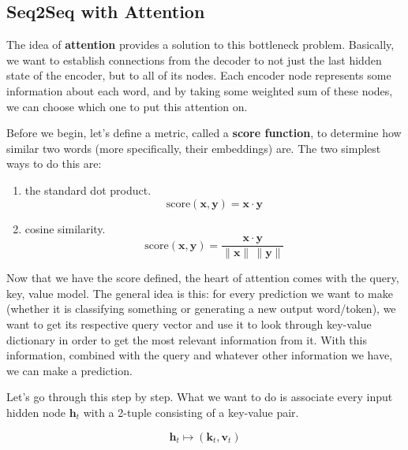 \subsection{Seq2Seq with Attention}

  The idea of \textbf{attention} provides a solution to this bottleneck problem. Basically, we want to establish connections from the decoder to not just the last hidden state of the encoder, but to all of its nodes. Each encoder node represents some information about each word, and by taking some weighted sum of these nodes, we can choose which one to put this attention on. 

  \begin{definition}
    \label{def:score-function}
    Before we begin, let's define a metric, called a \textbf{score function}, to determine how similar two words (more specifically, their embeddings) are. The two simplest ways to do this are: 
    \begin{enumerate}
      \item the standard dot product. 
        \begin{equation}
          \mathrm{score}(\mathbf{x}, \mathbf{y}) = \mathbf{x} \cdot \mathbf{y} 
        \end{equation}
      \item cosine similarity. 
        \begin{equation}
          \mathrm{score}(\mathbf{x}, \mathbf{y}) = \frac{\mathbf{x} \cdot \mathbf{y}}{\|\mathbf{x}\| \, \|\mathbf{y}\|}
        \end{equation}
    \end{enumerate}
  \end{definition}

  Now that we have the score defined, the heart of attention comes with the query, key, value model. The general idea is this: for every prediction we want to make (whether it is classifying something or generating a new output word/token), we want to get its respective query vector and use it to look through key-value dictionary in order to get the most relevant information from it. With this information, combined with the query and whatever other information we have, we can make a prediction. 

  Let's go through this step by step. What we want to do is associate every input hidden node $\mathbf{h}_t$ with a 2-tuple consisting of a key-value pair. 

  \begin{equation}
    \mathbf{h}_t \mapsto (\mathbf{k}_t, \mathbf{v}_t)
  \end{equation}

